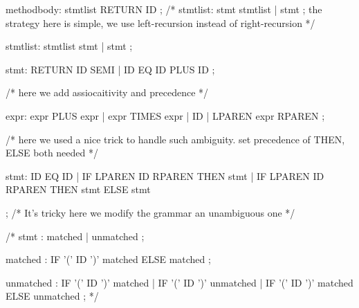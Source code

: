 \begin{enumerate}
\begin{bluecode}


methodbody: stmtlist RETURN ID {}
;
/*
stmtlist: stmt stmtlist {} | stmt {}
;
the strategy here is simple, we use left-recursion instead of 
right-recursion
*/

stmtlist: stmtlist stmt {} | stmt {}
;

stmt: RETURN ID SEMI {} | ID EQ ID PLUS ID {}
;

\end{bluecode}


\begin{bluecode}





/*
here we add assiocaitivity and precedence
*/




expr: expr PLUS expr {} 
  | expr TIMES expr {}
  | ID {}
  | LPAREN expr RPAREN {}
;
  
\end{bluecode}


\begin{bluecode}





/*
here we used a nice trick to 
handle such ambiguity. set precedence of THEN, ELSE
both needed
*/




stmt: ID EQ ID {}
  | IF LPAREN ID RPAREN THEN stmt {}
  | IF LPAREN ID RPAREN THEN stmt ELSE stmt {}

  
;
/*
It's tricky here we modify the grammar an unambiguous one 
*/


/*
stmt      : matched {}
          | unmatched {}
          ;

matched   : IF '(' ID ')' matched ELSE matched {}
          ;

unmatched : IF '(' ID ')' matched {}
          | IF '(' ID ')' unmatched {}
          | IF '(' ID ')' matched ELSE unmatched {}
          ;
*/

\end{bluecode}


\end{enumerate}
